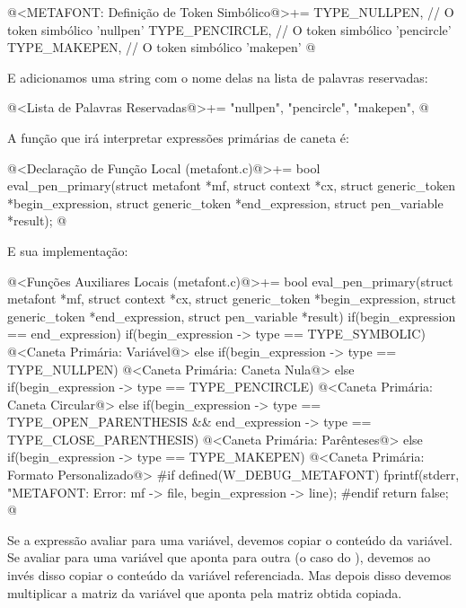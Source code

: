 {\iniciocodigo
@<METAFONT: Definição de Token Simbólico@>+=
TYPE_NULLPEN,        // O token simbólico 'nullpen'
TYPE_PENCIRCLE,      // O token simbólico 'pencircle'
TYPE_MAKEPEN,        // O token simbólico 'makepen'
@
\fimcodigo

E adicionamos uma string com o nome delas na lista de palavras
reservadas:

\iniciocodigo
@<Lista de Palavras Reservadas@>+=
"nullpen", "pencircle", "makepen",
@
\fimcodigo

A função que irá interpretar expressões primárias de caneta é:

\iniciocodigo
@<Declaração de Função Local (metafont.c)@>+=
bool eval_pen_primary(struct metafont *mf, struct context *cx,
                      struct generic_token *begin_expression,
                      struct generic_token *end_expression,
                      struct pen_variable *result);
@
\fimcodigo

E sua implementação:

\iniciocodigo
@<Funções Auxiliares Locais (metafont.c)@>+=
bool eval_pen_primary(struct metafont *mf, struct context *cx,
                      struct generic_token *begin_expression,
                      struct generic_token *end_expression,
                      struct pen_variable *result){
  if(begin_expression == end_expression){
    if(begin_expression -> type == TYPE_SYMBOLIC){
      @<Caneta Primária: Variável@>
    }
    else if(begin_expression -> type == TYPE_NULLPEN){
      @<Caneta Primária: Caneta Nula@>
    }
    else if(begin_expression -> type == TYPE_PENCIRCLE){
      @<Caneta Primária: Caneta Circular@>
    }
  }
  else{
    if(begin_expression -> type == TYPE_OPEN_PARENTHESIS &&
      end_expression -> type == TYPE_CLOSE_PARENTHESIS){
      @<Caneta Primária: Parênteses@>
    }
    else if(begin_expression -> type == TYPE_MAKEPEN){
      @<Caneta Primária: Formato Personalizado@>
    }
  }
#if defined(W_DEBUG_METAFONT)
  fprintf(stderr, "METAFONT: Error: %
          mf -> file, begin_expression -> line);
#endif
  return false;
}
@
\fimcodigo

Se a expressão avaliar para uma variável, devemos copiar o conteúdo da
variável. Se avaliar para uma variável que aponta para outra (o caso
do ), devemos ao invés disso copiar o conteúdo
da variável referenciada. Mas depois disso devemos multiplicar a
matriz da variável que aponta pela matriz obtida copiada.

}

